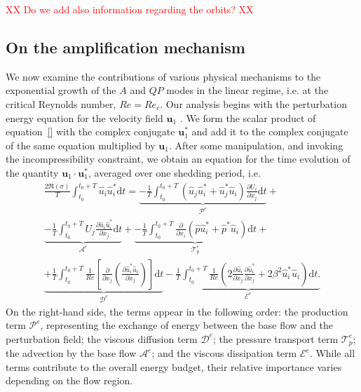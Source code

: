 \textcolor{red}{XX Do we add also information regarding the orbits? XX}


\subsection{On the amplification mechanism}

We now examine the contributions of various physical mechanisms to the exponential growth of the $A$ and $QP$ modes in the linear regime, i.e. at the critical Reynolds number, $Re = Re_c$. Our analysis begins with the perturbation energy equation for the velocity field $\bm{u}_1$ \citep[][]{}. We form the scalar product of equation~\eqref{} with the complex conjugate $\bm{u}_1^*$ and add it to the complex conjugate of the same equation multiplied by $\bm{u}_1$. After some manipulation, and invoking the incompressibility constraint, we obtain an equation for the time evolution of the quantity $\bm{u}_1 \cdot \bm{u}_1^*$, averaged over one shedding period, i.e.
\begin{equation}
  \begin{gathered}
  \frac{2 \Re(\sigma)}{T} \int_{t_0}^{t_0+T} \hat{u}_i \hat{u}_i^* \text{d}t = 
 \underbrace{-\frac{1}{T} \int_{t_0}^{t_0+T} \left( \hat{u}_j \hat{u}_i^* + \hat{u}_j^* \hat{u}_i \right) \frac{\partial U_i}{\partial x_j} \text{d} t}_{\mathcal{P}^e} +\\
 \underbrace{-\frac{1}{T} \int_{t_0}^{t_0+T} U_j \frac{\partial \hat{u}_i \hat{u}_i^*}{\partial x_j} \text{d} t }_{\mathcal{A}^e} + 
 \underbrace{-\frac{1}{T} \int_{t_0}^{t_0+T} \frac{\partial}{\partial x_i} \left( \hat{p} \hat{u}_i^* + \hat{p}^* \hat{u}_i \right) \text{d}t }_{\mathcal{T}_p^e}+ \\
\underbrace{ +\frac{1}{T} \int_{t_0}^{t_0+T} \frac{1}{Re} \left[ \frac{\partial}{\partial x_j} \left( \frac{\partial \hat{u}_i^* \hat{u}_i }{\partial x_j} \right) \right] \text{d}t }_{\mathcal{D}^e }
 - \underbrace{ \frac{1}{T} \int_{t_0}^{t_0+T} \frac{1}{Re} \left( 2 \frac{\partial \hat{u}_i}{\partial x_j} \frac{\partial \hat{u}_i^*}{\partial x_j} + 2 \beta^2 \hat{u}_i^* \hat{u}_i \right) \text{d} t. }_{\mathcal{E}^e}
 \end{gathered}
\end{equation}
%
On the right-hand side, the terms appear in the following order: the production term $\mathcal{P}^e$, representing the exchange of energy between the base flow and the perturbation field; the viscous diffusion term $\mathcal{D}^e$; the pressure transport term $\mathcal{T}_p^e$; the advection by the base flow $\mathcal{A}^e$; and the viscous dissipation term $\mathcal{E}^e$. While all terms contribute to the overall energy budget, their relative importance varies depending on the flow region.

